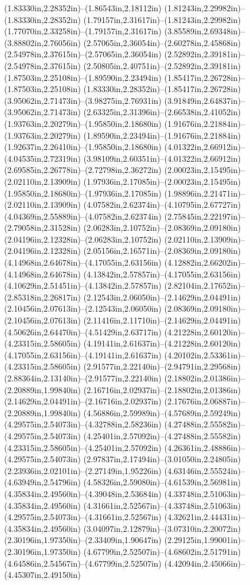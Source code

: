 (1.83330in,2.28352in)--(1.86543in,2.18112in) (1.81243in,2.29982in)--(1.83330in,2.28352in) (1.79157in,2.31617in)--(1.81243in,2.29982in) (1.77070in,2.33258in)--(1.79157in,2.31617in) (3.85589in,2.69348in)--(3.88802in,2.76056in) (2.57065in,2.36054in)--(2.60278in,2.45868in) (2.54978in,2.37615in)--(2.57065in,2.36054in) (2.52892in,2.39181in)--(2.54978in,2.37615in) (2.50805in,2.40751in)--(2.52892in,2.39181in) (1.87503in,2.25108in)--(1.89590in,2.23494in) (1.85417in,2.26728in)--(1.87503in,2.25108in) (1.83330in,2.28352in)--(1.85417in,2.26728in) (3.95062in,2.71473in)--(3.98275in,2.76931in) (3.91849in,2.64837in)--(3.95062in,2.71473in) (2.63325in,2.31396in)--(2.66538in,2.41052in) (1.93763in,2.20279in)--(1.95850in,2.18680in) (1.91676in,2.21884in)--(1.93763in,2.20279in) (1.89590in,2.23494in)--(1.91676in,2.21884in) (1.92637in,2.26410in)--(1.95850in,2.18680in) (4.01322in,2.66912in)--(4.04535in,2.72319in) (3.98109in,2.60351in)--(4.01322in,2.66912in) (2.69585in,2.26778in)--(2.72798in,2.36272in) (2.00023in,2.15495in)--(2.02110in,2.13909in) (1.97936in,2.17085in)--(2.00023in,2.15495in) (1.95850in,2.18680in)--(1.97936in,2.17085in) (1.98896in,2.21471in)--(2.02110in,2.13909in) (4.07582in,2.62374in)--(4.10795in,2.67727in) (4.04369in,2.55889in)--(4.07582in,2.62374in) (2.75845in,2.22197in)--(2.79058in,2.31528in) (2.06283in,2.10752in)--(2.08369in,2.09180in) (2.04196in,2.12328in)--(2.06283in,2.10752in) (2.02110in,2.13909in)--(2.04196in,2.12328in) (2.05156in,2.16571in)--(2.08369in,2.09180in) (4.14968in,2.64678in)--(4.17055in,2.63156in) (4.12882in,2.66202in)--(4.14968in,2.64678in) (4.13842in,2.57857in)--(4.17055in,2.63156in) (4.10629in,2.51451in)--(4.13842in,2.57857in) (2.82104in,2.17652in)--(2.85318in,2.26817in) (2.12543in,2.06050in)--(2.14629in,2.04491in) (2.10456in,2.07613in)--(2.12543in,2.06050in) (2.08369in,2.09180in)--(2.10456in,2.07613in) (2.11416in,2.11710in)--(2.14629in,2.04491in) (4.50626in,2.64470in)--(4.51429in,2.63717in) (4.21228in,2.60120in)--(4.23315in,2.58605in) (4.19141in,2.61637in)--(4.21228in,2.60120in) (4.17055in,2.63156in)--(4.19141in,2.61637in) (4.20102in,2.53361in)--(4.23315in,2.58605in) (2.91577in,2.22140in)--(2.94791in,2.29568in) (2.88364in,2.13140in)--(2.91577in,2.22140in) (2.18802in,2.01386in)--(2.20889in,1.99840in) (2.16716in,2.02937in)--(2.18802in,2.01386in) (2.14629in,2.04491in)--(2.16716in,2.02937in) (2.17676in,2.06887in)--(2.20889in,1.99840in) (4.56886in,2.59989in)--(4.57689in,2.59249in) (4.29575in,2.54073in)--(4.32788in,2.58236in) (4.27488in,2.55582in)--(4.29575in,2.54073in) (4.25401in,2.57092in)--(4.27488in,2.55582in) (4.23315in,2.58605in)--(4.25401in,2.57092in) (4.26361in,2.48886in)--(4.29575in,2.54073in) (2.97837in,2.17494in)--(3.01050in,2.24805in) (2.23936in,2.02101in)--(2.27149in,1.95226in) (4.63146in,2.55524in)--(4.63949in,2.54796in) (4.58326in,2.59080in)--(4.61539in,2.56981in) (4.35834in,2.49560in)--(4.39048in,2.53684in) (4.33748in,2.51063in)--(4.35834in,2.49560in) (4.31661in,2.52567in)--(4.33748in,2.51063in) (4.29575in,2.54073in)--(4.31661in,2.52567in) (4.32621in,2.44431in)--(4.35834in,2.49560in) (3.04097in,2.12879in)--(3.07310in,2.20072in) (2.30196in,1.97350in)--(2.33409in,1.90647in) (2.29125in,1.99001in)--(2.30196in,1.97350in) (4.67799in,2.52507in)--(4.68602in,2.51791in) (4.64586in,2.54567in)--(4.67799in,2.52507in) (4.42094in,2.45066in)--(4.45307in,2.49150in) 